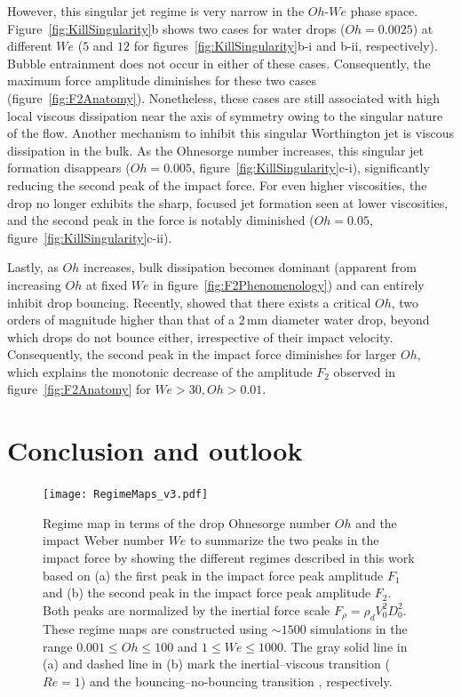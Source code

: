 \documentclass{jfm}
\begin{document}
	However, this singular jet regime is very narrow in the $Oh$-$We$ phase space. Figure~\ref{fig:KillSingularity}b shows two cases for water drops ($Oh = 0.0025$) at different $We$ ($5$ and $12$ for figures~\ref{fig:KillSingularity}b-i and b-ii, respectively). Bubble entrainment does not occur in either of these cases. Consequently, the maximum force amplitude diminishes for these two cases (figure~\ref{fig:F2Anatomy}). Nonetheless, these cases are still associated with high local viscous dissipation near the axis of symmetry owing to the singular nature of the flow. Another mechanism to inhibit this singular Worthington jet is viscous dissipation in the bulk. As the Ohnesorge number increases, this singular jet formation disappears ($Oh = 0.005$, figure~\ref{fig:KillSingularity}c-i), significantly reducing the second peak of the impact force. For even higher viscosities, the drop no longer exhibits the sharp, focused jet formation seen at lower viscosities, and the second peak in the force is notably diminished ($Oh = 0.05$, figure~\ref{fig:KillSingularity}c-ii).
	
	Lastly,  as $Oh$ increases, bulk dissipation becomes dominant (apparent from increasing $Oh$ at fixed $We$ in figure~\ref{fig:F2Phenomenology}) and can entirely inhibit drop bouncing. Recently, \citet{Jha2020, sanjay_chantelot_lohse_2023} showed that there exists a critical $Oh$, two orders of magnitude higher than that of a $2\,\si{\milli\meter}$ diameter water drop, beyond which drops do not bounce either, irrespective of their impact velocity. Consequently, the second peak in the impact force diminishes for larger $Oh$, which explains the monotonic decrease of the amplitude $F_2$ observed in figure~\ref{fig:F2Anatomy} for $We > 30, Oh > 0.01$.
	
	\section{Conclusion and outlook}\label{sec:Conclusion}
	
	\begin{figure}
		\centering
		\texttt{[image: RegimeMaps\_v3.pdf]}
		\caption{Regime map in terms of the drop Ohnesorge number $Oh$ and the impact Weber number $We$ to summarize the two peaks in the impact force by showing the different regimes described in this work based on (a) the first peak in the impact force peak amplitude $F_1$ and (b) the second peak in the impact force peak amplitude $F_2$. Both peaks are normalized by the inertial force scale $F_\rho = \rho_dV_0^2D_0^2$. These regime maps are constructed using $\sim 1500$ simulations in the range $0.001 \leq Oh \leq 100$ and $1 \leq We \leq 1000$. The gray solid line in (a) and dashed line in (b) mark the inertial--viscous transition ($Re = 1$) and the bouncing--no-bouncing transition \citep[$Oh_c = 0.53$ for $Bo = 1$, see][]{sanjay_chantelot_lohse_2023}, respectively.}
		\label{fig:RegimeMaps}
	\end{figure}
	
\end{document}
